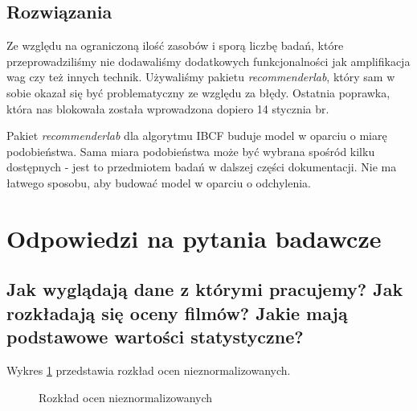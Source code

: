 \documentclass[12pt, a4paper]{article}
\begin{document}
\subsection{Rozwiązania}
Ze względu na ograniczoną ilość zasobów i sporą liczbę badań, które przeprowadziliśmy nie dodawaliśmy dodatkowych funkcjonalności jak amplifikacja wag czy też innych technik. Używaliśmy pakietu \emph{recommenderlab}, który sam w sobie okazał się być problematyczny ze względu za błędy. Ostatnia poprawka, która nas blokowała została wprowadzona dopiero 14 stycznia br. 

Pakiet \emph{recommenderlab} dla algorytmu IBCF buduje model w oparciu o miarę podobieństwa. Sama miara podobieństwa może być wybrana spośród kilku dostępnych - jest to przedmiotem badań w dalszej części dokumentacji. Nie ma łatwego sposobu, aby budować model w oparciu o odchylenia.

\section{Odpowiedzi na pytania badawcze}
\subsection{Jak wyglądają dane z którymi pracujemy? Jak rozkładają się oceny filmów? Jakie mają podstawowe wartości statystyczne?}
Wykres \ref{fig:histogram-ocen-nieznorm} przedstawia rozkład ocen nieznormalizowanych. 

\begin{figure}[H]
  \begin{center}
  \end{center}
  \caption{Rozkład ocen nieznormalizowanych}
  \label{fig:histogram-ocen-nieznorm}
\end{figure}
\end{document}
